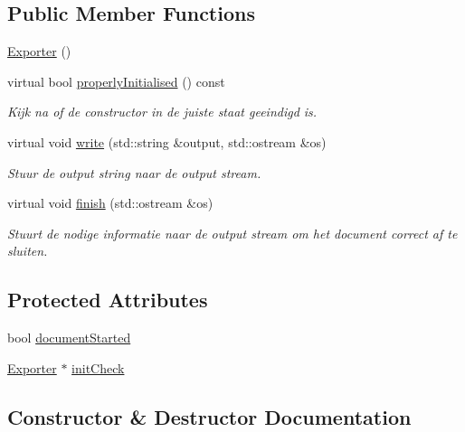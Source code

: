 \subsection*{Public Member Functions}
\begin{DoxyCompactItemize}
\item 
\hyperlink{class_exporter_a2a977cb5ac8f637fcb570e73f650eca0}{Exporter} ()
\item 
virtual bool \hyperlink{class_exporter_af01d2a6c2f54329b1867a19537e11a34}{properly\+Initialised} () const 
\begin{DoxyCompactList}\small\item\em Kijk na of de constructor in de juiste staat geeindigd is. \end{DoxyCompactList}\item 
virtual void \hyperlink{class_exporter_ab3736803133eb727cf87a7306f91eb11}{write} (std\+::string \&output, std\+::ostream \&os)
\begin{DoxyCompactList}\small\item\em Stuur de output string naar de output stream. \end{DoxyCompactList}\item 
virtual void \hyperlink{class_exporter_ae477714f462d70cfc5b3970f91fcc4ed}{finish} (std\+::ostream \&os)
\begin{DoxyCompactList}\small\item\em Stuurt de nodige informatie naar de output stream om het document correct af te sluiten. \end{DoxyCompactList}\end{DoxyCompactItemize}
\subsection*{Protected Attributes}
\begin{DoxyCompactItemize}
\item 
bool \hyperlink{class_exporter_a7d55f6023d5fe983512f6b02fb60733b}{document\+Started}
\item 
\hyperlink{class_exporter}{Exporter} $\ast$ \hyperlink{class_exporter_a74245e988d8e72a43704dda927acff05}{init\+Check}
\end{DoxyCompactItemize}


\subsection{Constructor \& Destructor Documentation}
